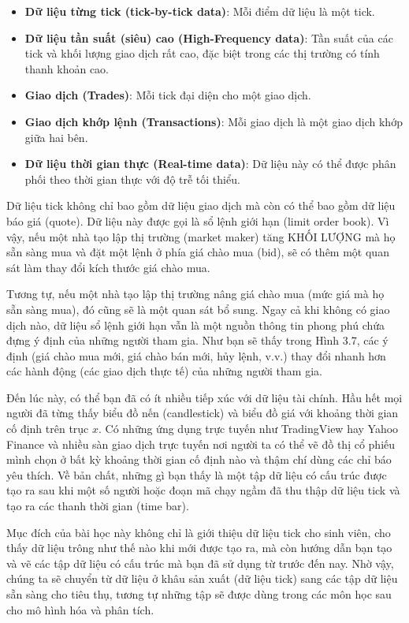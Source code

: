 \begin{itemize}
  \item \textbf{Dữ liệu từng tick (tick-by-tick data)}: Mỗi điểm dữ liệu là một tick.
  \item \textbf{Dữ liệu tần suất (siêu) cao (High-Frequency data)}: Tần suất của các tick và khối lượng giao dịch rất cao, đặc biệt trong các thị trường có tính thanh khoản cao.
  \item \textbf{Giao dịch (Trades)}: Mỗi tick đại diện cho một giao dịch.
  \item \textbf{Giao dịch khớp lệnh (Transactions)}: Mỗi giao dịch là một giao dịch khớp giữa hai bên.
  \item \textbf{Dữ liệu thời gian thực (Real-time data)}: Dữ liệu này có thể được phân phối theo thời gian thực với độ trễ tối thiểu.
\end{itemize}

Dữ liệu tick không chỉ bao gồm dữ liệu giao dịch mà còn có thể bao gồm dữ liệu báo giá (quote). Dữ liệu này được gọi là sổ lệnh giới hạn (limit order book). Vì vậy, nếu một nhà tạo lập thị trường (market maker) tăng KHỐI LƯỢNG mà họ sẵn sàng mua và đặt một lệnh ở phía giá chào mua (bid), sẽ có thêm một quan sát làm thay đổi kích thước giá chào mua.

Tương tự, nếu một nhà tạo lập thị trường nâng giá chào mua (mức giá mà họ sẵn sàng mua), đó cũng sẽ là một quan sát bổ sung. Ngay cả khi không có giao dịch nào, dữ liệu sổ lệnh giới hạn vẫn là một nguồn thông tin phong phú chứa đựng ý định của những người tham gia. Như bạn sẽ thấy trong Hình 3.7, các ý định (giá chào mua mới, giá chào bán mới, hủy lệnh, v.v.) thay đổi nhanh hơn các hành động (các giao dịch thực tế) của những người tham gia.

Đến lúc này, có thể bạn đã có ít nhiều tiếp xúc với dữ liệu tài chính. Hầu hết mọi người đã từng thấy biểu đồ nến (candlestick) và biểu đồ giá với khoảng thời gian cố định trên trục $x$. Có những ứng dụng trực tuyến như TradingView hay Yahoo Finance và nhiều sàn giao dịch trực tuyến nơi người ta có thể vẽ đồ thị cổ phiếu mình chọn ở bất kỳ khoảng thời gian cố định nào và thậm chí dùng các chỉ báo yêu thích. Về bản chất, những gì bạn thấy là một tập dữ liệu có cấu trúc được tạo ra sau khi một số người hoặc đoạn mã chạy ngầm đã thu thập dữ liệu tick và tạo ra các thanh thời gian (time bar).

Mục đích của bài học này không chỉ là giới thiệu dữ liệu tick cho sinh viên, cho thấy dữ liệu trông như thế nào khi mới được tạo ra, mà còn hướng dẫn bạn tạo và vẽ các tập dữ liệu có cấu trúc mà bạn đã sử dụng từ trước đến nay. Nhờ vậy, chúng ta sẽ chuyển từ dữ liệu ở khâu sản xuất (dữ liệu tick) sang các tập dữ liệu sẵn sàng cho tiêu thụ, tương tự những tập sẽ được dùng trong các môn học sau cho mô hình hóa và phân tích.

